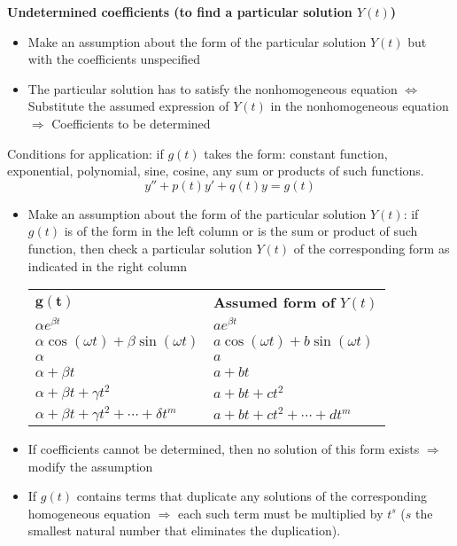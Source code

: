 {\bf Undetermined coefficients (to find
a particular solution $Y(t)$)}
\begin{itemize}
\item Make an assumption about the form of the particular solution
$Y(t)$ but with the coefficients unspecified
\item The particular solution has to satisfy the nonhomogeneous
equation $\Leftrightarrow$ Substitute the assumed expression of
$Y(t)$ in the nonhomogeneous equation $\Rightarrow$ Coefficients to
be determined
\end{itemize}
Conditions for application: 
if $g(t)$ takes the form: constant function, exponential, polynomial, sine, cosine, any sum or products of such functions.
$$y''+p(t)y'+q(t)y=g(t)$$
\begin{itemize}
\item Make an assumption about the form of the particular solution
 $Y(t)$: if $g(t)$ is of the form in the left column or is the sum or product of such function, then check a particular solution $Y(t)$ of the corresponding form as indicated in the right column
\begin{center}
\begin{tabular}{l|l}
$\mathbf{g(t)}$ & {\bf Assumed form of }$Y(t)$\\
$\alpha e^{\beta t}$& $ae^{\beta t}$\\
$\alpha \cos (\omega t) +\beta \sin (\omega t)$ & $a \cos (\omega t)
+b \sin (\omega t)$\\
$\alpha$ & $a$\\
$\alpha + \beta t$ & $a +bt$\\
$\alpha + \beta t +\gamma t^2$ & $a +bt +ct^2$\\
$\alpha + \beta t +\gamma t^2+ \cdots+\delta t^m$ & $a +bt +ct^2+ \cdots+d t^m$\\
\end{tabular}
\end{center}
\item If coefficients cannot be determined, then no solution of this
form exists $\Rightarrow$ modify the assumption
\item If $g(t)$ contains terms that duplicate any solutions of the corresponding homogeneous equation
$\Rightarrow$ each such term must be multiplied by $t^s$
($s$ the smallest natural number that eliminates the
duplication).
\end{itemize}


